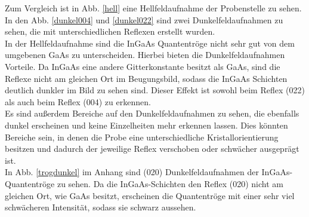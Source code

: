 \documentclass[a4paper,11pt,DIV=11]{scrartcl}
\begin{document}
Zum Vergleich ist in Abb. \ref{hell} eine Hellfeldaufnahme der Probenstelle zu sehen. In den Abb. \ref{dunkel004} und \ref{dunkel022} sind zwei Dunkelfeldaufnahmen zu sehen, die mit unterschiedlichen Reflexen erstellt wurden. \\
In der Hellfeldaufnahme sind die InGaAs Quantentröge nicht sehr gut von dem umgebenen GaAs zu unterscheiden. Hierbei bieten die Dunkelfeldaufnahmen Vorteile. Da InGaAs eine andere Gitterkonstante besitzt als GaAs, sind die Reflexe nicht am gleichen Ort im Beugungsbild, sodass die InGaAs Schichten deutlich dunkler im Bild zu sehen sind. Dieser Effekt ist sowohl beim Reflex (022) als auch beim Reflex (004) zu erkennen. \\
Es sind außerdem Bereiche auf den Dunkelfeldaufnahmen zu sehen, die ebenfalls dunkel erscheinen und keine Einzelheiten mehr erkennen lassen. Dies könnten Bereiche sein, in denen die Probe eine unterschiedliche Kristallorientierung besitzen und dadurch der jeweilige Reflex verschoben oder schwächer ausgeprägt ist. \\



In Abb. \ref{trogdunkel} im Anhang sind (020) Dunkelfeldaufnahmen der InGaAs-Quantentröge zu sehen. Da die InGaAs-Schichten den Reflex (020) nicht am gleichen Ort, wie GaAs besitzt, erscheinen die Quantentröge mit einer sehr viel schwächeren Intensität, sodass sie schwarz aussehen.
\end{document}
